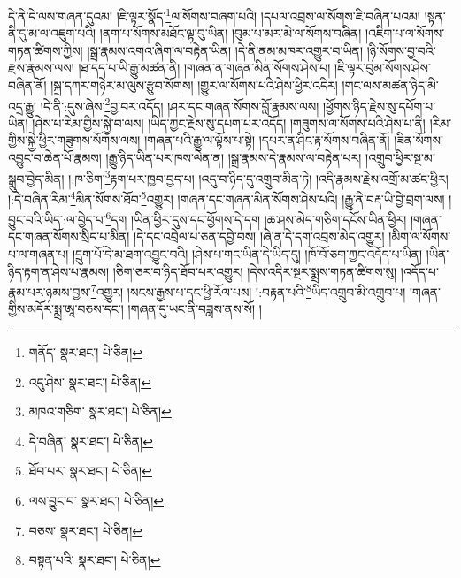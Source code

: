 དེ་ནི་དེ་ལས་གཞན་དུའམ། །ཇི་ལྟར་སྣོད་\footnote{གནོད་  སྣར་ཐང་།  པེ་ཅིན། }ལ་སོགས་བཞག་པའི། །དཔལ་འབྲས་ལ་སོགས་ཇི་བཞིན་པའམ། །སྟན་ནི་དུ་མ་ལ་འཇུག་པའི། །ནག་པ་སོགས་མཐོང་ལྟ་བུ་ཡིན། །བུམ་པ་མར་མེ་ལ་སོགས་བཞིན། །འཇིག་པ་ལ་སོགས་གཏན་ཚིགས་ཀྱིས། །སྒྲ་རྣམས་འགའ་ཞིག་ལ་བརྟེན་ཡིན། །དེ་ནི་ནམ་མཁར་འགྱུར་བ་ཡིན། །ཉི་སོགས་བྱ་བའི་རྫས་རྣམས་ལས། །ཐ་དད་པ་ཡི་རྒྱུ་མཚན་ནི། །གཞན་ན་གཞན་མིན་སོགས་ཤེས་པ། །ཇི་ལྟར་བུམ་སོགས་ཤེས་བཞིན་ནོ། །སྐྲ་དཀར་གཉེར་མ་ལུས་རྩུབ་སོགས། །གྱུར་ལ་སོགས་པའི་ཤེས་ཕྱིར་འདིར། །གང་ལས་མཚན་ཉིད་མི་འདྲ་རྒྱུ། །དེ་ནི་:དུས་ཞེས་\footnote{འདུ་ཤེས་  སྣར་ཐང་།  པེ་ཅིན། }བྱ་བར་འདོད། །ཤར་དང་གཞན་སོགས་བློ་རྣམས་ལས། །ཕྱོགས་ཉིད་རྗེས་སུ་དཔོག་པ་ཡིན། །ཤེས་པ་རིམ་གྱིས་སྐྱེ་བ་ལས། །ཡིད་ཀྱང་རྗེས་སུ་དཔག་པར་འདོད། །གཟུགས་ལ་སོགས་པའི་ཤེས་པ་ནི། །རིམ་གྱིས་སྐྱེ་ཕྱིར་གཟུགས་སོགས་ལས། །གཞན་པའི་རྒྱུ་ལ་ལྟོས་པ་སྟེ། །དཔར་ན་ཤིང་རྟ་སོགས་བཞིན་ནོ། །ཟིན་སོགས་འབྱུང་བ་ཆེན་པོ་རྣམས། །རྒྱུ་ཉིད་ཡིན་པར་ཁས་ལེན་ན། །སྒྲ་རྣམས་དེ་རྣམས་ལ་བརྟེན་པར། །འགྲུབ་ཕྱིར་སྔ་མ་སྒྲུབ་བྱེད་མིན། །:ཁ་ཅིག་\footnote{མཁའ་གཅིག་  སྣར་ཐང་།  པེ་ཅིན། }རྟག་པར་ཁྱབ་བྱད་པ། །འདུ་བ་ཉིད་དུ་འགྲུབ་མིན་ཏེ། །འདི་རྣམས་རྗེས་འགྲོ་མ་ཚང་ཕྱིར། །:དེ་བཞིན་རིམ་\footnote{དེ་བཞིན་  སྣར་ཐང་།  པེ་ཅིན། }མིན་སོགས་ཐོབ་\footnote{ཐོབ་པར་  སྣར་ཐང་།  པེ་ཅིན། }འགྱུར། །གཞན་དང་གཞན་མིན་སོགས་ཤེས་པའི། །རྒྱུ་ནི་བརྡ་ཡི་བྱེ་བྲག་ལས། །བྱུང་བའི་ཡིད་:ལ་བྱེད་པ་\footnote{ལས་བྱུང་བ་  སྣར་ཐང་།  པེ་ཅིན། }དག །ཡིན་ཕྱིར་དུས་དང་ཕྱོགས་དེ་དག །ཆ་ཤས་མེད་གཅིག་དངོས་ཡིན་ཕྱིར། །གཞན་དང་གཞན་སོགས་སྲིད་པ་མིན། །དེ་དང་འབྲེལ་པ་ཅན་དབྱེ་བས། །ཞེ་ན་དེ་དག་འབྲས་མེད་འགྱུར། །མིག་ལ་སོགས་པ་ལ་གཞན་པ། །དྲུག་པོ་དེ་མ་ཐག་འབྱུང་བའི། །ཤེས་པ་གང་ཡིན་དེ་ཡིད་དུ། །ཁོ་བོ་ཅག་ཀྱང་འདོད་པ་ཡིན། །ཡིན་ཉིད་རྟག་ན་ཤེས་པ་རྣམས། །ཅིག་ཅར་བ་ཉིད་ཐོབ་པར་འགྱུར། །དེས་འདིར་སྔར་སྨྲས་གཏན་ཚིགས་སུ། །འདོད་པ་རྣམ་པར་ཉམས་བྱས་\footnote{བཅས་  སྣར་ཐང་།  པེ་ཅིན། }འགྱུར། །སངས་རྒྱས་པ་དང་ཕྱི་རོལ་པས། །:བརྟན་པའི་\footnote{བསྟན་པའི་  སྣར་ཐང་།  པེ་ཅིན། }ཡིད་འགྲུབ་མི་འགྲུབ་པ། །གཞན་གྱིས་མདོར་སྨྲ་ཨཱ་བཅས་དང་། །གཞན་དུ་ཡང་ནི་བཟླས་ནས་སོ། །
